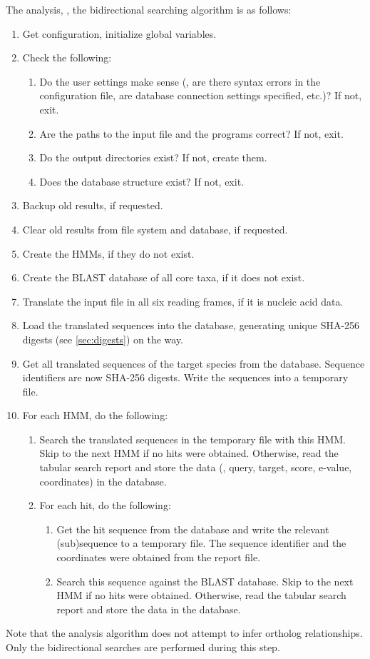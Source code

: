 The analysis, \ie, the bidirectional searching algorithm is as follows:

\begin{enumerate}
	\item Get configuration, initialize global variables.
	\item Check the following:
	\begin{enumerate}
		\item Do the user settings make sense (\eg, are there syntax errors in the
			configuration file, are database connection settings specified, etc.)? If
			not, exit.
		\item Are the paths to the input file and the programs correct? If not,
			exit.
		\item Do the output directories exist? If not, create them.
		\item Does the database structure exist? If not, exit.
	\end{enumerate}
	\item Backup old results, if requested.
	\item Clear old results from file system and database, if requested.
	\item Create the HMMs, if they do not exist.
	\item Create the BLAST database of all core taxa, if it does not exist.
	\item Translate the input file in all six reading frames, if it is nucleic
		acid data.
	\item Load the translated sequences into the database, generating unique
		SHA-256 digests (see \autoref{sec:digests}) on the way.
	\item Get all translated sequences of the target species from the database.
		Sequence identifiers are now SHA-256 digests. Write the sequences into a
		temporary file.
	\item For each HMM, do the following:
	\begin{enumerate}
		\item Search the translated sequences in the temporary file with this HMM.
			Skip to the next HMM if no hits were obtained. Otherwise, read the tabular
			search report and store the data (\eg, query, target, score, e-value,
			coordinates) in the database.
		\item For each hit, do the following:
		\begin{enumerate}
			\item Get the hit sequence from the database and write the relevant
				(sub)sequence to a temporary file. The sequence identifier and the
				coordinates were obtained from the  report file.
			\item Search this sequence against the BLAST database. Skip to the next
				HMM if no hits were obtained. Otherwise, read the tabular search report
				and store the data in the database. 
		\end{enumerate}
	\end{enumerate}
\end{enumerate}

Note that the analysis algorithm does not attempt to infer ortholog
relationships. Only the bidirectional searches are performed during this step. 
